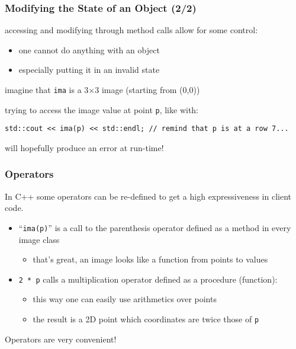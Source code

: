 \documentclass{beamer}
\newcommand{\cpp}{{C++}\xspace}
\newcommand{\code}[1]{{\scriptsize{\texttt{#1}}}\xspace}
\newcommand{\var}[1]{\texttt{#1}\xspace}
\begin{document}
\begin{frame}[fragile]
  \frametitle{Modifying the State of an Object (2/2)}

  accessing and modifying through method calls allow for some control:
  \begin{itemize}
  \item one cannot do anything with an object
  \item especially putting it in an invalid state
  \end{itemize}

  \smallskip

imagine that \var{ima} is a 3$\times$3 image (starting from (0,0))

trying to access the image value at point \var{p}, like with:
\begin{lstlisting}
std::cout << ima(p) << std::endl; // remind that p is at a row 7...
\end{lstlisting} %
will hopefully produce an error at run-time!

\end{frame}



\begin{frame}
  \frametitle{Operators}

  In \cpp some operators can be re-defined to get a high
  expressiveness in client code.

  \begin{itemize}
  \item ``\code{ima(p)}'' is a call to the parenthesis operator
    defined as a method in every image class
    \begin{itemize}
    \item that's great, an image looks like a function from points to
      values
    \end{itemize}
    \smallskip
  \item \code{2 * p} calls a multiplication operator defined as a
    procedure (function):
    \begin{itemize}
    \item this way one can easily use arithmetics over points
    \item the result is a 2D point which coordinates are twice those of \var{p}
    \end{itemize}
  \end{itemize}

  Operators are very convenient!

\end{frame}
\end{document}

